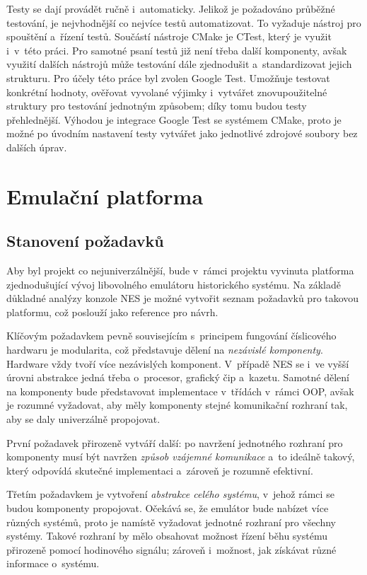 Testy se dají provádět ručně i~automaticky. Jelikož je požadováno průběžné testování, je nejvhodnější co nejvíce testů automatizovat. To vyžaduje nástroj pro spouštění a~řízení testů. Součástí nástroje CMake je CTest, který je využit i~v~této práci. Pro samotné psaní testů již není třeba další komponenty, avšak využití dalších nástrojů může testování dále zjednodušit a~standardizovat jejich strukturu. Pro účely této práce byl zvolen Google Test. Umožňuje testovat konkrétní hodnoty, ověřovat vyvolané výjimky i~vytvářet znovupoužitelné struktury pro testování jednotným způsobem; díky tomu budou testy přehlednější. Výhodou je integrace Google Test se systémem CMake, proto je možné po úvodním nastavení testy vytvářet jako jednotlivé zdrojové soubory bez dalších úprav.

\section{Emulační platforma}
\label{sec:navrh-platforma}
\subsection{Stanovení požadavků}
\label{sec:navrh-pozadavky}

Aby byl projekt co nejuniverzálnější, bude v~rámci projektu vyvinuta platforma zjednodušující vývoj libovolného emulátoru historického systému. Na základě důkladné analýzy konzole NES je možné vytvořit seznam požadavků pro takovou platformu, což poslouží jako reference pro návrh.

Klíčovým požadavkem pevně souvisejícím s~principem fungování číslicového hardwaru je modularita, což představuje dělení na \emph{nezávislé komponenty}. Hardware vždy tvoří více nezávislých komponent. V~případě NES se i~ve vyšší úrovni abstrakce jedná třeba o~procesor, grafický čip a~kazetu. Samotné dělení na komponenty bude představovat implementace v~třídách v~rámci OOP, avšak je rozumné vyžadovat, aby měly komponenty stejné komunikační rozhraní tak, aby se daly univerzálně propojovat.

První požadavek přirozeně vytváří další: po navržení jednotného rozhraní pro komponenty musí být navržen \emph{způsob vzájemné komunikace} a~to ideálně takový, který odpovídá skutečné implementaci a~zároveň je rozumně efektivní.

Třetím požadavkem je vytvoření \emph{abstrakce celého systému}, v~jehož rámci se budou komponenty propojovat. Očekává se, že emulátor bude nabízet více různých systémů, proto je namístě vyžadovat jednotné rozhraní pro všechny systémy. Takové rozhraní by mělo obsahovat možnost řízení běhu systému přirozeně pomocí hodinového signálu; zároveň i~možnost, jak získávat různé informace o~systému.

